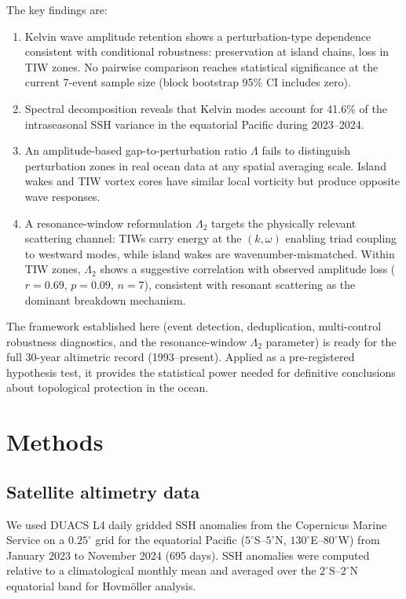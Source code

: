 \documentclass[11pt]{article}
\begin{document}
The key findings are:
\begin{enumerate}
\item Kelvin wave amplitude retention shows a perturbation-type dependence consistent with conditional robustness: preservation at island chains, loss in TIW zones. No pairwise comparison reaches statistical significance at the current 7-event sample size (block bootstrap 95\% CI includes zero).
\item Spectral decomposition reveals that Kelvin modes account for 41.6\% of the intraseasonal SSH variance in the equatorial Pacific during 2023--2024.
\item An amplitude-based gap-to-perturbation ratio $\Lambda$ fails to distinguish perturbation zones in real ocean data at any spatial averaging scale. Island wakes and TIW vortex cores have similar local vorticity but produce opposite wave responses.
\item A resonance-window reformulation $\Lambda_2$ targets the physically relevant scattering channel: TIWs carry energy at the $(k, \omega)$ enabling triad coupling to westward modes, while island wakes are wavenumber-mismatched. Within TIW zones, $\Lambda_2$ shows a suggestive correlation with observed amplitude loss ($r = 0.69$, $p = 0.09$, $n = 7$), consistent with resonant scattering as the dominant breakdown mechanism.
\end{enumerate}

The framework established here (event detection, deduplication, multi-control robustness diagnostics, and the resonance-window $\Lambda_2$ parameter) is ready for the full 30-year altimetric record (1993--present). Applied as a pre-registered hypothesis test, it provides the statistical power needed for definitive conclusions about topological protection in the ocean.

\section{Methods}
\label{sec:methods}

\subsection{Satellite altimetry data}

We used DUACS L4 daily gridded SSH anomalies\cite{Duacs2016} from the Copernicus Marine Service on a $0.25^\circ$ grid for the equatorial Pacific ($5^\circ$S--$5^\circ$N, $130^\circ$E--$80^\circ$W) from January 2023 to November 2024 (695 days). SSH anomalies were computed relative to a climatological monthly mean and averaged over the $2^\circ$S--$2^\circ$N equatorial band for Hovm\"oller analysis.
\end{document}
